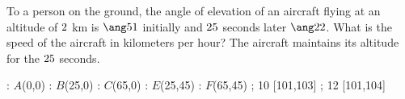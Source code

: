 

\DEGREESCOT\va\vm
\DEGREESCOT\vb\vn
\ROUND[2]\vm\vx
\ROUND[2]\vn\vy
\SUBTRACT\vn\vm\vz
\MULTIPLY\vh\vz\vd %
\ROUND[3]\vd\vj
\MULTIPLY{}\ve
\ROUND[2]\ve\vf
\DIVIDE\ve\vt\vr
\ROUND[2]\vr\vs

\question[3] To a person on the ground, the angle of elevation of an aircraft flying at an altitude of $2$ km 
is $\ang\va$ initially and $25$ seconds later $\ang\vb$. What is the speed of the
aircraft in kilometers per hour? The aircraft maintains its altitude for the $25$ seconds.

\watchout
{}

\ifprintanswers
  \begin{marginfigure}
      : $A$(0,0)
      : $B$(25,0)
      : $C$(65,0)
      : $E$(25,45)
      : $F$(65,45)
    \figdrawbegin{}
      \figdrawline [100,101,102,104,103,100]
      \figdrawline [100,103]
      \figdrawline [100,104]
      \figdrawline [103,101]
       ; 10 [101,103] 
       ; 12 [101,104] 
    \figdrawend
    \centerline{\box\figBoxA}
  \end{marginfigure}
\fi 

